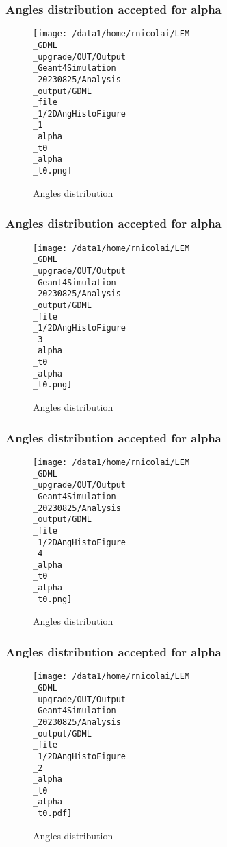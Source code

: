 \documentclass[8pt]{beamer}
\begin{document}
            \begin{frame}
                \frametitle{Angles distribution accepted for alpha}
            
        \begin{figure}[h]
            \centering
            \texttt{[image: /data1/home/rnicolai/LEM\\\_GDML\\\_upgrade/OUT/Output\\\_Geant4Simulation\\\_20230825/Analysis\\\_output/GDML\\\_file\\\_1/2DAngHistoFigure\\\_1\\\_alpha\\\_t0\\\_alpha\\\_t0.png]}
            \caption{Angles distribution}
        \end{figure}
        
            \end{frame}
            
            \begin{frame}
                \frametitle{Angles distribution accepted for alpha}
            
        \begin{figure}[h]
            \centering
            \texttt{[image: /data1/home/rnicolai/LEM\\\_GDML\\\_upgrade/OUT/Output\\\_Geant4Simulation\\\_20230825/Analysis\\\_output/GDML\\\_file\\\_1/2DAngHistoFigure\\\_3\\\_alpha\\\_t0\\\_alpha\\\_t0.png]}
            \caption{Angles distribution}
        \end{figure}
        
            \end{frame}
            
            \begin{frame}
                \frametitle{Angles distribution accepted for alpha}
            
        \begin{figure}[h]
            \centering
            \texttt{[image: /data1/home/rnicolai/LEM\\\_GDML\\\_upgrade/OUT/Output\\\_Geant4Simulation\\\_20230825/Analysis\\\_output/GDML\\\_file\\\_1/2DAngHistoFigure\\\_4\\\_alpha\\\_t0\\\_alpha\\\_t0.png]}
            \caption{Angles distribution}
        \end{figure}
        
            \end{frame}
            
            \begin{frame}
                \frametitle{Angles distribution accepted for alpha}
            
        \begin{figure}[h]
            \centering
            \texttt{[image: /data1/home/rnicolai/LEM\\\_GDML\\\_upgrade/OUT/Output\\\_Geant4Simulation\\\_20230825/Analysis\\\_output/GDML\\\_file\\\_1/2DAngHistoFigure\\\_2\\\_alpha\\\_t0\\\_alpha\\\_t0.pdf]}
            \caption{Angles distribution}
        \end{figure}
        
            \end{frame}
            
\end{document}
